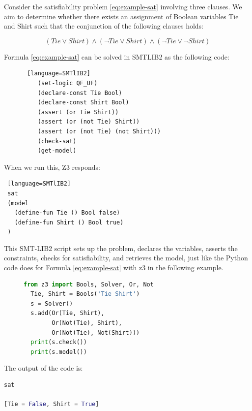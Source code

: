 \documentclass[]{rptuseminar}
\begin{document}
Consider the satisfiability problem \ref{eq:example-sat} involving three clauses. 
We aim to determine whether there exists an assignment of Boolean variables Tie and Shirt such that the conjunction of the following clauses holds:

\begin{equation}
  \label{eq:example-sat}
  (Tie \lor Shirt) \land (\lnot Tie \lor Shirt) \land (\lnot Tie \lor \lnot Shirt)
\end{equation}

Formula \ref{eq:example-sat}  can be solved in SMTLIB2 as the following code:

\begin{figure}[ht]
  \begin{lstlisting} [language=SMTlIB2]
    (set-logic QF_UF)
    (declare-const Tie Bool)
    (declare-const Shirt Bool)
    (assert (or Tie Shirt))
    (assert (or (not Tie) Shirt))
    (assert (or (not Tie) (not Shirt)))
    (check-sat)
    (get-model)
  \end{lstlisting}
  \end{figure}

  When we run this, Z3 responds:
\begin{lstlisting} [language=SMTlIB2]
 sat
 (model
   (define-fun Tie () Bool false)
   (define-fun Shirt () Bool true)
 )
\end{lstlisting}
\vspace{1em}

  This SMT-LIB2 script sets up the problem, declares the variables, asserts the constraints, checks for satisfiability, and retrieves the model, just like the Python code does for Formula \ref{eq:example-sat}  with z3 in the following example.

\begin{figure}[ht]
\begin{lstlisting}[language=Python]
  from z3 import Bools, Solver, Or, Not
  Tie, Shirt = Bools('Tie Shirt')
  s = Solver()
  s.add(Or(Tie, Shirt),
        Or(Not(Tie), Shirt),
        Or(Not(Tie), Not(Shirt)))
  print(s.check())
  print(s.model())
\end{lstlisting}
\end{figure}

\vspace{1em}
The output of the code is:
\begin{lstlisting}[language=Python]
sat

[Tie = False, Shirt = True]
\end{lstlisting}
\vspace{1em}
\end{document}
